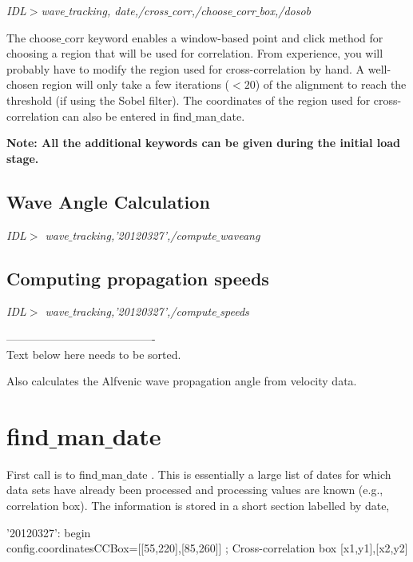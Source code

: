 \documentclass{article}
\begin{document}
\medskip
\textit{IDL$>$wave$\_$tracking, date,/cross$\_$corr,/choose$\_$corr$\_$box,/dosob}
\medskip

The choose$\_$corr keyword enables a window-based point and click method for choosing a region that will be used for correlation. 
From experience, you will probably have to modify the region used for cross-correlation by hand. A well-chosen region will only
take a few iterations ($<20$) of the alignment to reach the threshold (if using the Sobel filter). The coordinates of the 
region used for cross-correlation can also be entered in find$\_$man$\_$date.


\medskip
\textbf{Note: All the additional keywords can be given during the initial load stage.}

\subsection{Wave Angle Calculation}

\textit{IDL$>$ wave$\_$tracking,'20120327',/compute$\_$waveang}

\subsection{Computing propagation speeds}

\textit{IDL$>$ wave$\_$tracking,'20120327',/compute$\_$speeds}


----------------------------------------\\
Text below here needs to be sorted.

Also calculates the Alfvenic wave propagation angle from velocity data.


\section{find$\_$man$\_$date}

First call is to find$\_$man$\_$date . This is essentially a large list of dates for which data sets have already been processed and processing values are known (e.g., correlation box). The information is stored in a short section labelled by date, 


 '20120327': begin\\
 
 \hspace{1.5cm}      config.coordinatesCCBox=[[55,220],[85,260]] ; Cross-correlation box [x1,y1],[x2,y2]\\
\end{document}
